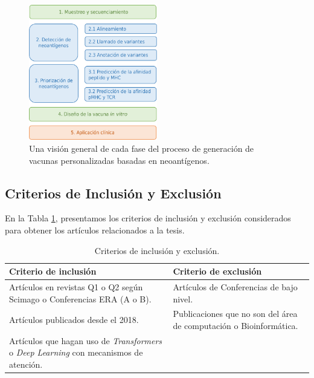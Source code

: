 \begin{figure}[h]
	\centering	
	\includegraphics[width=0.5\textwidth]{img/pipeline/pipeline_spanish}	
	\caption{Una visión general de cada fase del proceso de generación de vacunas personalizadas basadas en neoantígenos.}
	\label{fig:etapas}
\end{figure}

\subsection{Criterios de Inclusión y Exclusión}
En la Tabla \ref{tab:criterios}, presentamos los criterios de inclusión y exclusión considerados para obtener los artículos relacionados a la tesis.

\begin{table}[h]
	\begin{center}
		\caption{Criterios de inclusión y exclusión.}
		\label{tab:criterios}
		\small
		\setlength{\tabcolsep}{0.5em} %
		{\renewcommand{\arraystretch}{1.5}%
			\begin{tabular}{p{6cm}p{6cm}}
				\textbf{Criterio de inclusión}                                                   & \textbf{Criterio de exclusión}                                                           \\ \hline
				Artículos en revistas Q1 o Q2 según Scimago o Conferencias ERA (A o B). & Artículos de Conferencias de bajo nivel.  \\
				
				Artículos publicados desde el 2018. & Publicaciones que no son del área de computación o Bioinformática. \\      
				
				Artículos que hagan uso de \textit{Transformers} o \textit{Deep Learning} con mecanismos de atención. & \\                                                                                                 
			\end{tabular}
		}
	\end{center}
\end{table}


